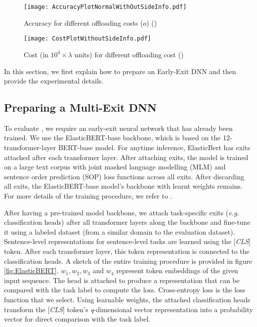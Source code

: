 \begin{figure*}
    \centering \texttt{[image: AccuracyPlotNormalWithOutSideInfo.pdf]}
    \caption{Accuracy for different offloading costs ($o$) (\our{})}
    \label{fig:Accuracy_res_eesplit}
\end{figure*}

\begin{figure*}
    \centering \texttt{[image: CostPlotWithoutSideInfo.pdf]}
    \caption{Cost (in $10^4\times\lambda$ units) for different offloading cost (\our{})}
    \label{fig:cost_res_eesplit}
\end{figure*}
In this section, we first explain how to prepare an Early-Exit DNN and then provide the experimental details.
\subsection{Preparing a Multi-Exit DNN}\label{sec: ElasticBERT}
To evaluate \our{}, we require an early-exit neural network that has already been trained. We use the ElasticBERT-base backbone, which is based on the 12-transformer-layer BERT-base model. For anytime inference, ElasticBert has exits attached after each transformer layer. After attaching exits, the model is trained on a large text corpus with joint masked language modelling (MLM) and sentence order prediction (SOP) loss functions across all exits. After discarding all exits, the ElasticBERT-base model's backbone with learnt weights remains. For more details of the training procedure, we refer to \cite{liu2021elasticbert}.

After having a pre-trained model backbone, we attach task-specific exits (\textit{e.g.} classification heads) after all transformer layers along the backbone and fine-tune it using a labeled dataset (from a similar domain to the evaluation dataset). Sentence-level representations for sentence-level tasks are learned using the [\textit{CLS}] token. After each transformer layer, this token representation is connected to the classification heads. 
A sketch of the entire training procedure is provided in figure \ref{fig:ElasticBERT}. $w_1, w_2, w_3$ and $w_4 $ represent token embeddings of the given input sequence. The head is attached to produce a representation that can be compared with the task label to compute the loss. Cross-entropy loss is the loss function that we select. Using learnable weights, the attached classification heads transform the [\textit{CLS}] token's \textit{q}-dimensional vector representation into a probability vector for direct comparison with the task label. 



